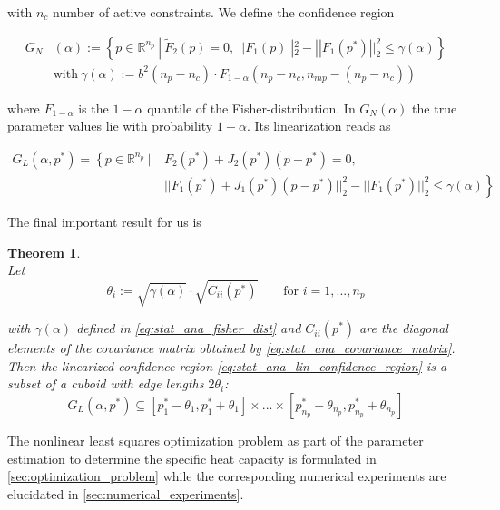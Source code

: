 \documentclass{scrartcl}[12pt, halfparskip]
\numberwithin{equation}{section}
\numberwithin{figure}{section}
\numberwithin{table}{section}
\newtheorem{Theorem}{Theorem}
\begin{document}
with $n_c$ number of active constraints. We define the confidence region

\begin{align}
	G_N&(\alpha)  := \left\{ p \in \mathbb{R}^{n_p} \ | \ \tilde{F}_2(p) = 0, \ || F_1(p) ||_2^2 - || F_1(p^*) ||_2^2 \le \gamma(\alpha) \right\} \\
	& \text{with} \ \gamma(\alpha) := b^2 (n_p - n_c) \cdot F_{1-\alpha}(n_p - n_c, n_{mp} - (n_p - n_c)) \label{eq:stat_ana_fisher_dist}
\end{align} 

where $F_{1-\alpha}$ is the $1-\alpha$ quantile of the Fisher-distribution. In $G_N(\alpha)$ the true parameter values lie with probability $1-\alpha$. Its linearization reads as

\begin{align}
	G_L(\alpha, p^*) = \left\{ p \in \mathbb{R}^{n_p} \ | \ \right. & F_2(p^*) + J_2(p^*)(p - p^*) = 0, \label{eq:stat_ana_lin_confidence_region} \\ 
	& \left. || F_1(p^*) + J_1(p^*)(p - p^*) ||_2^2 - || F_1(p^*)||_2^2 \le \gamma(\alpha) \right\} \nonumber	
\end{align}



The final important result for us is

\begin{Theorem} \mbox{}\\
	Let 
	\begin{equation}
		\theta_i := \sqrt{\gamma(\alpha)} \cdot \sqrt{C_{ii}(p^*)} \qquad \text{for } i=1,...,n_p
	\end{equation}
	
with $\gamma(\alpha)$ defined in \cref{eq:stat_ana_fisher_dist} and $C_{ii}(p^*)$ are the diagonal elements of the covariance matrix obtained by \cref{eq:stat_ana_covariance_matrix}. Then the linearized confidence region \cref{eq:stat_ana_lin_confidence_region} is a subset of a cuboid with edge lengths $2 \theta_i$:
	\begin{equation}
		G_L(\alpha, p^*) \subseteq [p_1^* - \theta_1, p_1^* + \theta_1] \times ... \times [p_{n_p}^* - \theta_{n_p}, p_{n_p}^* + \theta_{n_p}]
	\end{equation}
	
\end{Theorem}


\vspace{0.5cm}
The nonlinear least squares optimization problem as part of the parameter estimation to determine the specific heat capacity is formulated in \cref{sec:optimization_problem} while the corresponding numerical experiments are elucidated in \cref{sec:numerical_experiments}.
\end{document}

